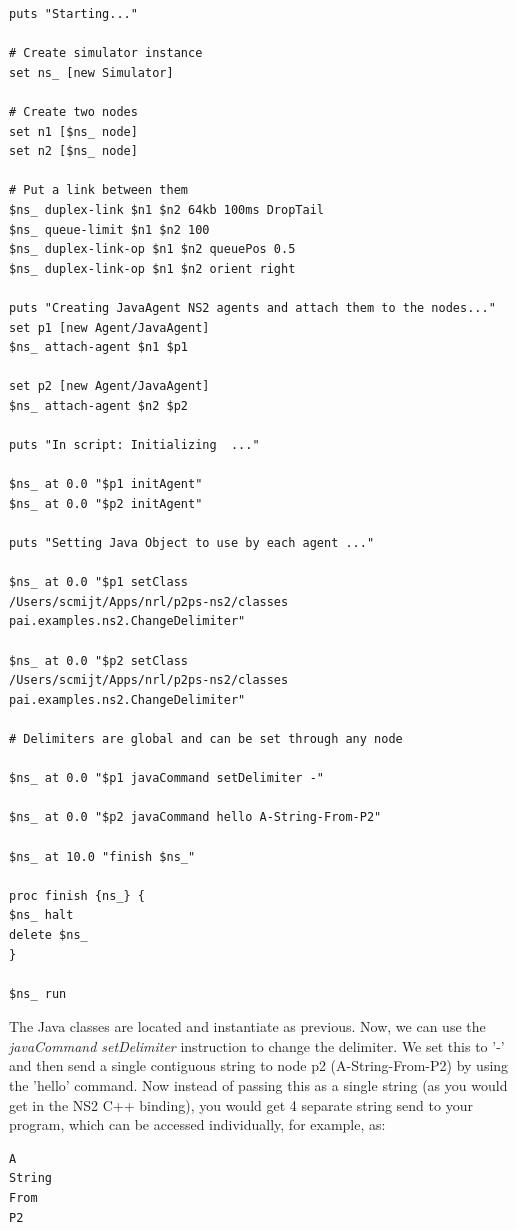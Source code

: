 \footnotesize
\begin{verbatim}
puts "Starting..."   

# Create simulator instance
set ns_ [new Simulator]

# Create two nodes
set n1 [$ns_ node]
set n2 [$ns_ node]

# Put a link between them
$ns_ duplex-link $n1 $n2 64kb 100ms DropTail
$ns_ queue-limit $n1 $n2 100
$ns_ duplex-link-op $n1 $n2 queuePos 0.5
$ns_ duplex-link-op $n1 $n2 orient right
   
puts "Creating JavaAgent NS2 agents and attach them to the nodes..."   
set p1 [new Agent/JavaAgent]
$ns_ attach-agent $n1 $p1

set p2 [new Agent/JavaAgent]
$ns_ attach-agent $n2 $p2
    
puts "In script: Initializing  ..." 
	
$ns_ at 0.0 "$p1 initAgent"
$ns_ at 0.0 "$p2 initAgent"

puts "Setting Java Object to use by each agent ..." 

$ns_ at 0.0 "$p1 setClass 
/Users/scmijt/Apps/nrl/p2ps-ns2/classes pai.examples.ns2.ChangeDelimiter"

$ns_ at 0.0 "$p2 setClass 
/Users/scmijt/Apps/nrl/p2ps-ns2/classes pai.examples.ns2.ChangeDelimiter"

# Delimiters are global and can be set through any node

$ns_ at 0.0 "$p1 javaCommand setDelimiter -" 

$ns_ at 0.0 "$p2 javaCommand hello A-String-From-P2" 

$ns_ at 10.0 "finish $ns_"

proc finish {ns_} {
$ns_ halt
delete $ns_
}

$ns_ run
\end{verbatim}
\normalsize

The Java classes are located and instantiate as previous. Now, we can
use the \emph{javaCommand setDelimiter} instruction to change
the delimiter.  We set this to '-' and then send a single contiguous string
to node p2 (A-String-From-P2) by using the 'hello' command.  Now
instead of passing this as a single string (as you would get in the NS2 
C++ binding), you would get 4 separate string send to your program,
which can be accessed individually, for example, as:

\begin{verbatim}
A
String
From
P2
\end{verbatim}

